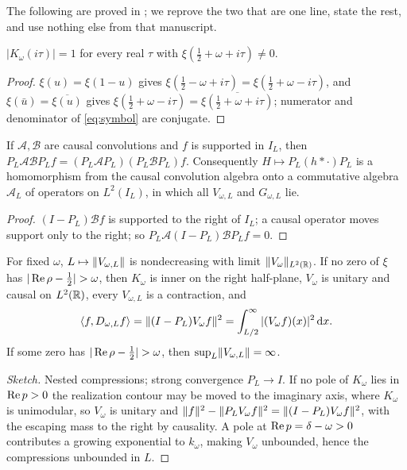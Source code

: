 The following are proved in \cite{WilsonLines}; we reprove the two that are
one line, state the rest, and use nothing else from that manuscript.

\begin{proposition}\label{prop:unimodular}
$|K_\omega(i\tau)|=1$ for every real $\tau$ with $\xi(\frac12+\omega+i\tau)\neq0$.
\end{proposition}
\begin{proof}
$\xi(u)=\xi(1-u)$ gives $\xi(\frac12-\omega+i\tau)=\xi(\frac12+\omega-i\tau)$,
and $\xi(\bar u)=\overline{\xi(u)}$ gives
$\xi(\frac12+\omega-i\tau)=\overline{\xi(\frac12+\omega+i\tau)}$; numerator and
denominator of \eqref{eq:symbol} are conjugate.
\end{proof}

\begin{lemma}\label{lem:multiplicative}
If $\mathcal A,\mathcal B$ are causal convolutions and $f$ is supported in
$I_L$, then $P_L\mathcal A\mathcal BP_Lf=(P_L\mathcal AP_L)(P_L\mathcal BP_L)f$.
Consequently $H\mapsto P_L(h*\cdot)P_L$ is a homomorphism from the causal
convolution algebra onto a commutative algebra $\mathcal A_L$ of operators on
$L^2(I_L)$, in which all $V_{\omega,L}$ and $G_{\omega,L}$ lie.
\end{lemma}
\begin{proof}
$(I-P_L)\mathcal Bf$ is supported to the right of $I_L$; a causal operator
moves support only to the right; so $P_L\mathcal A(I-P_L)\mathcal BP_Lf=0$.
\end{proof}

\begin{proposition}\label{prop:dichotomy}
For fixed $\omega$, $L\mapsto\lVert V_{\omega,L}\rVert$ is nondecreasing with limit
$\lVert V_\omega\rVert_{L^2(\mathbb R)}$. If no zero of $\xi$ has $|\re\rho-\frac12|>\omega$,
then $K_\omega$ is inner on the right half-plane, $V_\omega$ is unitary and
causal on $L^2(\mathbb R)$, every $V_{\omega,L}$ is a contraction, and
\begin{equation}\label{eq:flux}
 \langle f,D_{\omega,L}f\rangle=\lVert (I-P_L)V_\omega f\rVert^2=\int_{L/2}^\infty|(V_\omega f)(x)|^2\,\mathrm d x .
\end{equation}
If some zero has $|\re\rho-\frac12|>\omega$, then $\sup_L\lVert V_{\omega,L}\rVert=\infty$.
\end{proposition}
\begin{proof}[Sketch]
Nested compressions; strong convergence $P_L\to I$. If no pole of $K_\omega$
lies in $\operatorname{Re} p>0$ the realization contour may be moved to the imaginary axis,
where $K_\omega$ is unimodular, so $V_\omega$ is unitary and
$\lVert f\rVert^2-\lVert P_LV_\omega f\rVert^2=\lVert (I-P_L)V_\omega f\rVert^2$, with the escaping
mass to the right by causality. A pole at $\operatorname{Re} p=\delta-\omega>0$ contributes a
growing exponential to $k_\omega$, making $V_\omega$ unbounded, hence the
compressions unbounded in $L$.
\end{proof}


